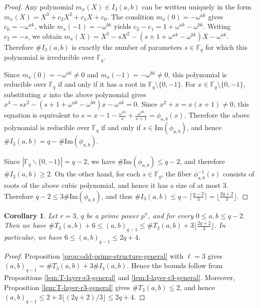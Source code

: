 \documentclass[10pt,a4paper]{article}
\newtheorem{cor}[thm]{Corollary}
\numberwithin{equation}{section}
\begin{document}
\begin{proof}
Any polynomial $m_x(X)\in I_{3}(a,b)$ can be written uniquely in the form $m_x(X)=X^3+c_2X^2+c_1X+c_0$. The condition $m_x(0)=-\omega^{ak}$ gives $c_0=-\omega^{ak}$, while $m_x(-1)=-\omega^{bk}$ yields $c_2-c_1=1+\omega^{ak}-\omega^{bk}$. Writing $c_2=-s$, we obtain
$m_x(X)=X^3-sX^2-(s+1+\omega^{ak}-\omega^{bk})X-\omega^{ak}$.
Therefore $\#I_3(a,b)$ is exactly the number of parameters $s\in\mathbb{F}_q$ for which this polynomial is irreducible over $\mathbb{F}_q$.

Since $m_x(0)=-\omega^{ak}\neq 0$ and $m_x(-1)=-\omega^{bk}\neq 0$, this polynomial is reducible over $\mathbb{F}_q$ if and only if it has a root in $\mathbb{F}_q\setminus\{0,-1\}$. For $x\in \mathbb{F}_q\setminus\{0,-1\}$, substituting $x$ into the above polynomial gives
$x^3-sx^2-(s+1+\omega^{ak}-\omega^{bk})x-\omega^{ak}=0$.
Since $x^2+x=x(x+1)\neq0$, this equation is equivalent to
$s=x-1-\frac{\omega^{ak}}{x}+\frac{\omega^{bk}}{x+1}=\phi_{a,b}(x)$.
Therefore the above polynomial is reducible over $\mathbb{F}_q$ if and only if $s\in \mathrm{Im}(\phi_{a,b})$, and hence $\#I_3(a,b)=q-\#\mathrm{Im}(\phi_{a,b})$.

Since $|\mathbb{F}_{q}\backslash \{0,-1\}|=q-2$, we have $\#\mathrm{Im}(\phi_{a,b})\le q-2$, and therefore $\#I_3(a,b)\ge 2$. On the other hand, for each $s\in \mathbb{F}_q$, the fiber $\phi_{a,b}^{-1}(s)$ consists of roots of the above cubic polynomial, and hence it has a size of at most $3$. Therefore $q-2\le 3\#\mathrm{Im}(\phi_{a,b})$, and thus $\#I_3(a,b)\le q-\lceil\frac{q-2}{3}\rceil=\lfloor\frac{2q+2}{3}\rfloor$.
\end{proof}

\begin{cor}\label{cor:r3-structure-general}
Let $r=3$, $q$ be a prime power $p^n$, and for every $0\le a,b\le q-2$. Then we have
$\# T_{3}(a,b)+6\le (a,b)_{q-1}\le \# T_{3}(a,b)+3\lfloor\frac{2q+2}{3}\rfloor$.
In particular, we have $6\le (a,b)_{q-1}\le 2q+4$.
\end{cor}

\begin{proof}
Proposition \ref{prop:odd-prime-structure-general} with $\ell=3$ gives $(a,b)_{q-1}=\#T_3(a,b)+3\#I_3(a,b)$. Hence the bounds follow from Propositions \ref{lem:T-layer-r3-general} and \ref{lem:I-layer-r3-general}. Moreover, Proposition \ref{lem:T-layer-r3-general} gives $\#T_3(a,b)\le 2$, and hence $(a,b)_{q-1}\le 2+3\lfloor(2q+2)/3\rfloor\le 2q+4$.
\end{proof}
\end{document}
